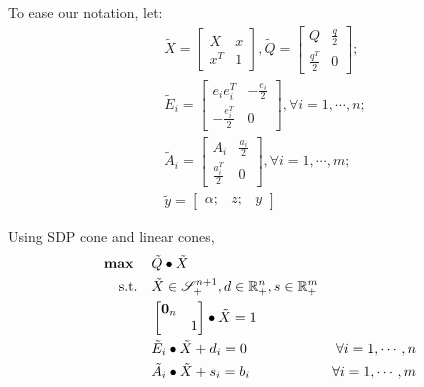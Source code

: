 \documentclass[../main]{subfiles}
\begin{document}
To ease our notation, let:
\begin{align*}
     & \tilde X = \begin{bmatrix} X             & x \\ x^T & 1 \end{bmatrix}, \tilde Q = \begin{bmatrix} Q & \frac{q}{2} \\ \frac{q^T}{2} & 0 \end{bmatrix} ; \\
     & \tilde E_i = \begin{bmatrix} e_ie_i^T  & -\frac{e_i}{2} \\ -\frac{e_i^T}{2} & 0 \end{bmatrix}, \forall i=1,\cdots,n;                \\
     & \tilde A_i = \begin{bmatrix} A_i             & \frac{a_i}{2} \\ \frac{a_i^T}{2} & 0 \end{bmatrix}, \forall i=1,\cdots,m;               \\
     & \tilde y = \begin{bmatrix} \alpha; & z; & y \end{bmatrix}
\end{align*}

Using SDP cone and linear cones,
\begin{equation} \label{eq:ws.std.primal}
    \begin{aligned}
        \mathbf{max}\;\quad            & \tilde Q \bullet \tilde X                                                         \\
        \mathrm{s.t.} \quad & \tilde X  \in \mathscr S^{n+1}_+, d \in \mathbb{R}^n_+, s
        \in \mathbb{R}^m_+                                                                                      \\
                            & \begin{bmatrix}  \bm 0_n &  \\  & 1  \end{bmatrix} \bullet \tilde X = 1                                   \\
                            & \tilde E_i \bullet \tilde X + d_i = 0                     & \forall i=1,\cdots, n \\
                            & \tilde A_i \bullet \tilde X + s_i = b_i                   & \forall i=1,\cdots, m \\
    \end{aligned}
\end{equation}
\end{document}
